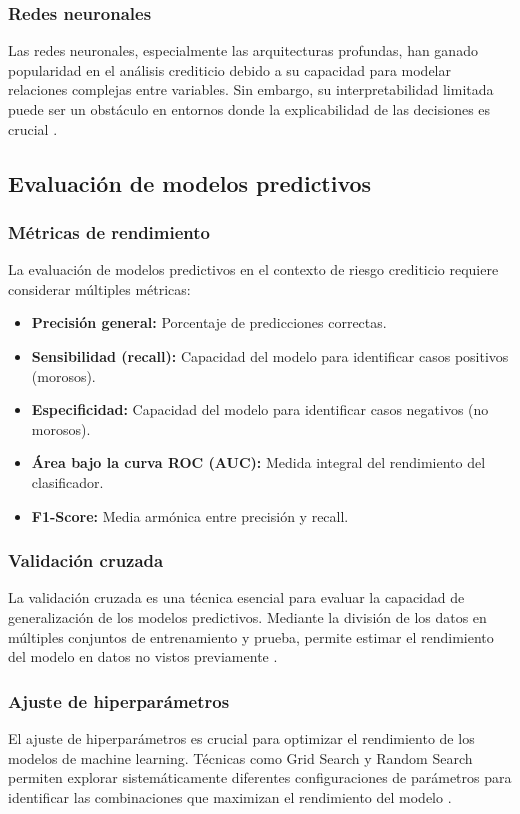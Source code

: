 \subsubsection{Redes neuronales}
Las redes neuronales, especialmente las arquitecturas profundas, han ganado popularidad en el análisis crediticio debido a su capacidad para modelar relaciones complejas entre variables. Sin embargo, su interpretabilidad limitada puede ser un obstáculo en entornos donde la explicabilidad de las decisiones es crucial \cite{garcia2024machine}.

\subsection{Evaluación de modelos predictivos}
\subsubsection{Métricas de rendimiento}
La evaluación de modelos predictivos en el contexto de riesgo crediticio requiere considerar múltiples métricas:

\begin{itemize}
    \item \textbf{Precisión general:} Porcentaje de predicciones correctas.
    \item \textbf{Sensibilidad (recall):} Capacidad del modelo para identificar casos positivos (morosos).
    \item \textbf{Especificidad:} Capacidad del modelo para identificar casos negativos (no morosos).
    \item \textbf{Área bajo la curva ROC (AUC):} Medida integral del rendimiento del clasificador.
    \item \textbf{F1-Score:} Media armónica entre precisión y recall.
\end{itemize}

\subsubsection{Validación cruzada}
La validación cruzada es una técnica esencial para evaluar la capacidad de generalización de los modelos predictivos. Mediante la división de los datos en múltiples conjuntos de entrenamiento y prueba, permite estimar el rendimiento del modelo en datos no vistos previamente \cite{hernandez2020metodologia}.

\subsubsection{Ajuste de hiperparámetros}
El ajuste de hiperparámetros es crucial para optimizar el rendimiento de los modelos de machine learning. Técnicas como Grid Search y Random Search permiten explorar sistemáticamente diferentes configuraciones de parámetros para identificar las combinaciones que maximizan el rendimiento del modelo \cite{garcia2024machine}.


